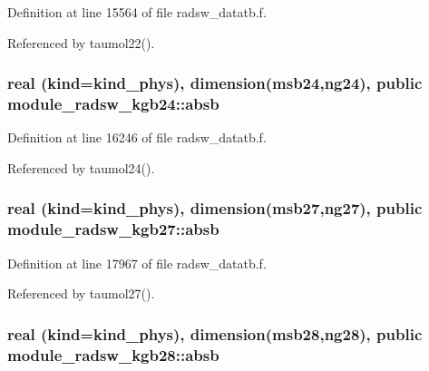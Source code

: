 Definition at line 15564 of file radsw\+\_\+datatb.\+f.



Referenced by taumol22().

\subsubsection[{\texorpdfstring{absb}{absb}}]{\setlength{\rightskip}{0pt plus 5cm}real (kind=kind\+\_\+phys), dimension(msb24,ng24), public module\+\_\+radsw\+\_\+kgb24\+::absb}\hypertarget{group__module__radsw__main_gabd4db3c9678fee17f2cfd4a3e290619a}{}\label{group__module__radsw__main_gabd4db3c9678fee17f2cfd4a3e290619a}


Definition at line 16246 of file radsw\+\_\+datatb.\+f.



Referenced by taumol24().

\subsubsection[{\texorpdfstring{absb}{absb}}]{\setlength{\rightskip}{0pt plus 5cm}real (kind=kind\+\_\+phys), dimension(msb27,ng27), public module\+\_\+radsw\+\_\+kgb27\+::absb}\hypertarget{group__module__radsw__main_ga8edb349c908e6950e0d18f293dd1b6ea}{}\label{group__module__radsw__main_ga8edb349c908e6950e0d18f293dd1b6ea}


Definition at line 17967 of file radsw\+\_\+datatb.\+f.



Referenced by taumol27().

\subsubsection[{\texorpdfstring{absb}{absb}}]{\setlength{\rightskip}{0pt plus 5cm}real (kind=kind\+\_\+phys), dimension(msb28,ng28), public module\+\_\+radsw\+\_\+kgb28\+::absb}\hypertarget{group__module__radsw__main_gac3834ddd9d9e2106dc739094c800d09b}{}\label{group__module__radsw__main_gac3834ddd9d9e2106dc739094c800d09b}


